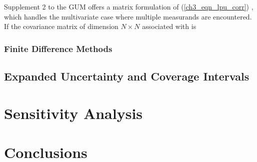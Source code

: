 \documentclass[../thesis/thesis.tex]{subfiles}
\begin{document}
\begin{refsection}
Supplement 2 to the GUM offers a matrix formulation of (\ref{ch3_eqn_lpu_corr}) \cite[6.2.1.3]{GUM_S2}, which handles the multivariate case where multiple measurands are encountered. If the covariance matrix of dimension $N \times N$ associated with is

\subsubsection{Finite Difference Methods}
\subsection{Expanded Uncertainty and Coverage Intervals}
\section{Sensitivity Analysis}
\section{Conclusions}
\printbibliography
\end{refsection}
\end{document}
